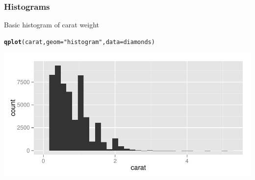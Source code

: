 \documentclass{beamer}\usepackage[]{graphicx}\usepackage[]{color}
\makeatletter
\newcommand{\hlstr}[1]{\textcolor[rgb]{0.192,0.494,0.8}{#1}}%
\newcommand{\hlstd}[1]{\textcolor[rgb]{0.345,0.345,0.345}{#1}}%
\newcommand{\hlkwc}[1]{\textcolor[rgb]{0.333,0.667,0.333}{#1}}%
\newcommand{\hlkwd}[1]{\textcolor[rgb]{0.737,0.353,0.396}{\textbf{#1}}}%
\newenvironment{kframe}{%
 \def\at@end@of@kframe{}%
 \ifinner\ifhmode%
  \def\at@end@of@kframe{\end{minipage}}%
  \begin{minipage}{\columnwidth}%
 \fi\fi%
 \def\FrameCommand##1{\hskip\@totalleftmargin \hskip-\fboxsep
 \colorbox{shadecolor}{##1}\hskip-\fboxsep
     \hskip-\linewidth \hskip-\@totalleftmargin \hskip\columnwidth}%
 \MakeFramed {\advance\hsize-\width
   \@totalleftmargin\z@ \linewidth\hsize
   \@setminipage}}%
 {\par\unskip\endMakeFramed%
 \at@end@of@kframe}
\newenvironment{knitrout}{}{} %
\makeatother
\begin{document}

\begin{frame}[fragile]
\frametitle{Histograms}
    
Basic histogram of carat weight
    
\footnotesize
\begin{knitrout}\footnotesize
{}\color{fgcolor}\begin{kframe}
\begin{alltt}
\hlkwd{qplot}\hlstd{(carat,} \hlkwc{geom}\hlstd{=}\hlstr{"histogram"}\hlstd{,} \hlkwc{data}\hlstd{=diamonds)}
\end{alltt}


{\ttfamily\noindent\itshape\color{messagecolor}{\#\# stat\_bin: binwidth defaulted to range/30. Use 'binwidth = x' to adjust this.}}\end{kframe}

{\centering \includegraphics[width=.9\linewidth]{figure/kdiamondhist1} 

}



\end{knitrout}
\normalsize
\end{frame}



\end{document}
